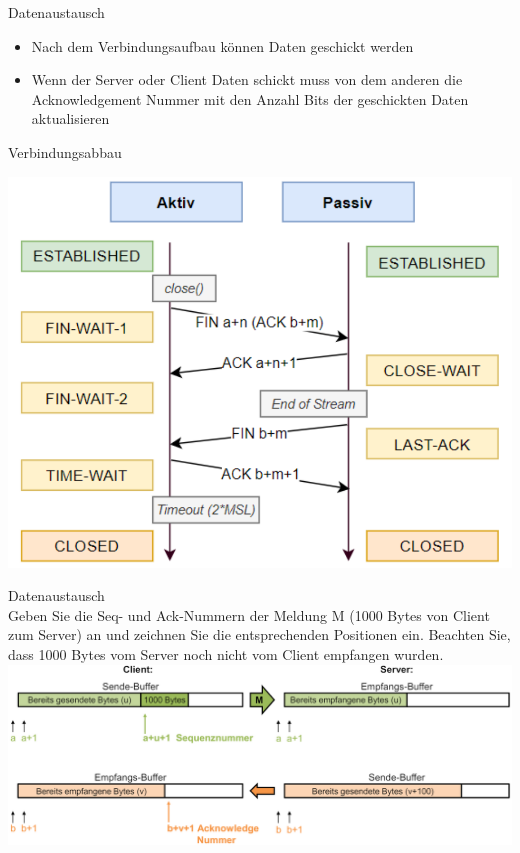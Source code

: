 \begin{KR}{Datenaustausch}
    \begin{itemize}
        \item Nach dem Verbindungsaufbau können Daten geschickt werden
        \item Wenn der Server oder Client Daten schickt muss von dem anderen die Acknowledgement Nummer
        mit den Anzahl Bits der geschickten Daten aktualisieren
    \end{itemize}
\end{KR}

\begin{KR}{Verbindungsabbau}
    \begin{center}
        \includegraphics[width=0.7\linewidth]{images/Verbindungsabbau.png}
    \end{center}
\end{KR}

\begin{example2}{Datenaustausch}\\
    Geben Sie die Seq- und Ack-Nummern der Meldung M (1000 Bytes von Client zum Server) an und zeichnen Sie die entsprechenden Positionen ein. Beachten Sie, dass 1000 Bytes vom Server noch nicht vom Client empfangen wurden.\\
    \includegraphics[width=1\linewidth]{images/datenaustausch_tcp_example.png}
\end{example2}

